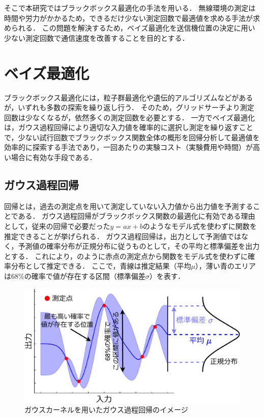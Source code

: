 \documentclass[twocolumn]{ltjarticle}
\begin{document}
そこで本研究ではブラックボックス最適化の手法を用いる．
無線環境の測定は時間や労力がかかるため，できるだけ少ない測定回数で最適値を求める手法が求められる．
この問題を解決するため，ベイズ最適化を送信機位置の決定に用い少ない測定回数で通信速度を改善することを目的とする．


\section{ベイズ最適化}

ブラックボックス最適化には，粒子群最適化や遺伝的アルゴリズムなどがあるが，いずれも多数の探索を繰り返し行う．
そのため，グリッドサーチより測定回数は少なくなるが，依然多くの測定回数を必要とする．
一方でベイズ最適化は，ガウス過程回帰により適切な入力値を確率的に選択し測定を繰り返すことで，少ない試行回数でブラックボックス関数全体の概形を回帰分析して最適値を効率的に探索する手法であり，一回あたりの実験コスト（実験費用や時間）が高い場合に有効な手段である．

\subsection{ガウス過程回帰}

回帰とは，過去の測定点を用いて測定していない入力値から出力値を予測することである．
ガウス過程回帰がブラックボックス関数の最適化に有効である理由として，従来の回帰で必要だった\(y=ax+b\)のようなモデル式を使わずに関数を推定できることが挙げられる．
ガウス過程回帰は，出力として予測値ではなく，予測値の確率分布が正規分布に従うものとして，その平均と標準偏差を出力とする．
これにより，のように赤点の測定点から関数をモデル式を使わずに確率分布として推定できる．
ここで，青線は推定結果（平均\(\mu\)），薄い青のエリアは68\%の確率で値が存在する区間（標準偏差\(\sigma\)）を表す．
\setlength\intextsep{3pt}
\setlength\textfloatsep{3pt}
\begin{figure}[htbp]
	\centering
	\includegraphics[width=0.8\linewidth]{./figures/material_5_kernel_v2.pdf}
	\vspace*{-0.3cm}
	\caption{ガウスカーネルを用いたガウス過程回帰のイメージ} \label{fig:gaussian_process}
\end{figure}
\end{document}
